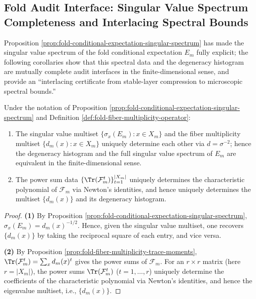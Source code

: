 \subsection{Fold Audit Interface: Singular Value Spectrum Completeness and Interlacing Spectral Bounds}\label{subsec:op-algebra-fold-audit-spectrum}
Proposition \ref{prop:fold-conditional-expectation-singular-spectrum} has made the singular value spectrum of the fold conditional expectation \(E_m\) fully explicit;
the following corollaries show that this spectral data and the degeneracy histogram are mutually complete audit interfaces in the finite-dimensional sense,
and provide an ``interlacing certificate from stable-layer compression to microscopic spectral bounds.''

\begin{corollary}\label{cor:fold-conditional-expectation-spectrum-histogram}
Under the notation of Proposition \ref{prop:fold-conditional-expectation-singular-spectrum} and Definition \ref{def:fold-fiber-multiplicity-operator}:
\begin{enumerate}
  \item The singular value multiset \(\{\sigma_x(E_m):x\in X_m\}\) and the fiber multiplicity multiset \(\{d_m(x):x\in X_m\}\) uniquely determine each other via \(d=\sigma^{-2}\); hence the degeneracy histogram and the full singular value spectrum of \(E_m\) are equivalent in the finite-dimensional sense.
  \item The power sum data \(\{\Tr(\mathcal{F}_m^{t})\}_{t=1}^{|X_m|}\) uniquely determines the characteristic polynomial of \(\mathcal{F}_m\) via Newton's identities, and hence uniquely determines the multiset \(\{d_m(x)\}\) and its degeneracy histogram.
\end{enumerate}
\end{corollary}
\begin{proof}
\textbf{(1)} By Proposition \ref{prop:fold-conditional-expectation-singular-spectrum},
\(\sigma_x(E_m)=d_m(x)^{-1/2}\).
Hence, given the singular value multiset, one recovers \(\{d_m(x)\}\) by taking the reciprocal square of each entry, and vice versa.
\par
\textbf{(2)} By Proposition \ref{prop:fold-fiber-multiplicity-trace-moments},
\(\Tr(\mathcal{F}_m^{t})=\sum_x d_m(x)^{t}\) gives the power sums of \(\mathcal{F}_m\).
For an \(r\times r\) matrix (here \(r=|X_m|\)), the power sums \(\Tr(\mathcal{F}_m^{t})\) (\(t=1,\dots,r\)) uniquely determine the coefficients of the characteristic polynomial via Newton's identities,
and hence the eigenvalue multiset, i.e., \(\{d_m(x)\}\). \qedhere
\end{proof}

